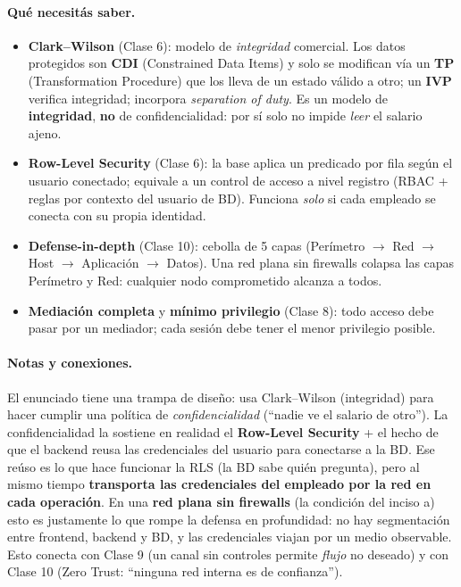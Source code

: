 \paragraph{Qué necesitás saber.}
\begin{itemize}
  \item \textbf{Clark--Wilson} (Clase 6): modelo de \emph{integridad} comercial. Los datos protegidos son \textbf{CDI} (Constrained Data Items) y solo se modifican vía un \textbf{TP} (Transformation Procedure) que los lleva de un estado válido a otro; un \textbf{IVP} verifica integridad; incorpora \emph{separation of duty}. Es un modelo de \textbf{integridad}, \textbf{no} de confidencialidad: por sí solo no impide \emph{leer} el salario ajeno.
  \item \textbf{Row-Level Security} (Clase 6): la base aplica un predicado por fila según el usuario conectado; equivale a un control de acceso a nivel registro (RBAC + reglas por contexto del usuario de BD). Funciona \emph{solo} si cada empleado se conecta con su propia identidad.
  \item \textbf{Defense-in-depth} (Clase 10): cebolla de 5 capas (Perímetro $\to$ Red $\to$ Host $\to$ Aplicación $\to$ Datos). Una red plana sin firewalls colapsa las capas Perímetro y Red: cualquier nodo comprometido alcanza a todos.
  \item \textbf{Mediación completa} y \textbf{mínimo privilegio} (Clase 8): todo acceso debe pasar por un mediador; cada sesión debe tener el menor privilegio posible.
\end{itemize}

\paragraph{Notas y conexiones.}
El enunciado tiene una trampa de diseño: usa Clark--Wilson (integridad) para hacer cumplir una política de \emph{confidencialidad} (``nadie ve el salario de otro''). La confidencialidad la sostiene en realidad el \textbf{Row-Level Security} + el hecho de que el backend reusa las credenciales del usuario para conectarse a la BD. Ese reúso es lo que hace funcionar la RLS (la BD sabe quién pregunta), pero al mismo tiempo \textbf{transporta las credenciales del empleado por la red en cada operación}. En una \textbf{red plana sin firewalls} (la condición del inciso a) esto es justamente lo que rompe la defensa en profundidad: no hay segmentación entre frontend, backend y BD, y las credenciales viajan por un medio observable. Esto conecta con Clase 9 (un canal sin controles permite \emph{flujo} no deseado) y con Clase 10 (Zero Trust: ``ninguna red interna es de confianza'').

